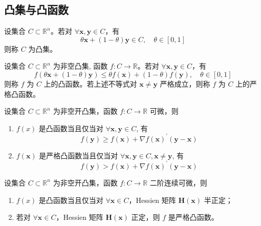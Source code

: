 \documentclass[cn]{elegantbook}
\begin{document}
\subsection{凸集与凸函数}

\begin{definition}[凸集]
    设集合 $C\subset\mathbb{R}^{n}$。若对 $\forall\mathbf{x},\mathbf{y}\in C$，有
    \begin{equation}
        \theta \mathbf{x}+(1-\theta)\mathbf{y}\in C,\quad\theta\in[0,1]
    \end{equation}
    则称 $C$ 为凸集。
\end{definition}

\begin{definition}[凸函数]
    设集合 $C\subset\mathbb{R}^{n}$ 为非空凸集, 函数 $f:C\rightarrow\mathbb{R}$。若对 $\forall\mathbf{x},\mathbf{y}\in C$，有
    \begin{equation}
        f(\theta\mathbf{x}+(1-\theta)\mathbf{y})\leq\theta f(\mathbf{x})+(1-\theta)f(\mathbf{y}),\quad\theta\in[0,1]
    \end{equation}
    则称 $f$ 为 $C$ 上的凸函数。若上述不等式对 $\mathbf{x}\neq\mathbf{y}$ 严格成立，则称 $f$ 为 $C$ 上的严格凸函数。
\end{definition}

\begin{theorem}[凸函数的一阶判定条件]
    设集合 $C\subset\mathbb{R}^{n}$ 为非空开凸集，函数 $f:C\rightarrow\mathbb{R}$ 可微，则
    \begin{enumerate}
        \item $f(x)$ 是凸函数当且仅当对 $\forall\mathbf{x},\mathbf{y}\in C$, 有
              \begin{equation}
                  f(\mathbf{y})\geq f(\mathbf{x})+\nabla f(\mathbf{x})^{\prime}(\mathbf{y}-\mathbf{x})
              \end{equation}
        \item $f(\mathbf{x})$ 是严格凸函数当且仅当对 $\forall\mathbf{x},\mathbf{y}\in C,\mathbf{x}\neq\mathbf{y}$, 有
              \begin{equation}
                  f(\mathbf{y})>f(\mathbf{x})+\nabla f(\mathbf{x})^{\prime}(\mathbf{y}-\mathbf{x})
              \end{equation}
    \end{enumerate}
\end{theorem}

\begin{theorem}[凸函数的二阶判定条件]
    设集合 $C\subset\mathbb{R}^{n}$ 为非空开凸集，函数 $f:C\rightarrow\mathbb{R}$ 二阶连续可微，则
    \begin{enumerate}
        \item $f(x)$ 是凸函数当且仅当对 $\forall\mathbf{x}\in C$，Hessien 矩阵 $\boldsymbol{H}(\mathbf{x})$ 半正定；
        \item 若对 $\forall\mathbf{x}\in C$，Hessien 矩阵 $\boldsymbol{H}(\mathbf{x})$ 正定，则 $f$ 是严格凸函数。
    \end{enumerate}
\end{theorem}
\end{document}
